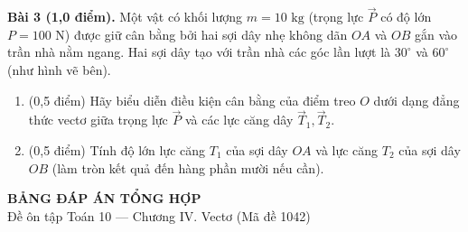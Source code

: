 \documentclass[10pt,a4paper]{article}
\begin{document}
\vspace{6pt}
\textbf{Bài 3 (1,0 điểm).} Một vật có khối lượng $m = 10\text{ kg}$ (trọng lực $\vec{P}$ có độ lớn $P = 100\text{ N}$) được giữ cân bằng bởi hai sợi dây nhẹ không dãn $OA$ và $OB$ gắn vào trần nhà nằm ngang. Hai sợi dây tạo với trần nhà các góc lần lượt là $30^\circ$ và $60^\circ$ (như hình vẽ bên).
\par\noindent\begin{minipage}[t]{0.70\linewidth}
\begin{enumerate}[label=\alph*), itemsep=2pt]
    \item (0,5 điểm) Hãy biểu diễn điều kiện cân bằng của điểm treo $O$ dưới dạng đẳng thức vectơ giữa trọng lực $\vec{P}$ và các lực căng dây $\vec{T}_1, \vec{T}_2$.
    \item (0,5 điểm) Tính độ lớn lực căng $T_1$ của sợi dây $OA$ và lực căng $T_2$ của sợi dây $OB$ (làm tròn kết quả đến hàng phần mười nếu cần).
\end{enumerate}
\end{minipage}\hfill
\begin{minipage}[t]{0.28\linewidth}\raggedleft\vspace{-15pt}
\end{minipage}


\newpage
\pagestyle{dapan}
\setcounter{page}{1}

\begin{center}
  {\Large\bfseries\color{ink} BẢNG ĐÁP ÁN TỔNG HỢP}\\[2pt]
  {\small\color{gray!75!black} Đề ôn tập Toán 10 — Chương IV. Vectơ (Mã đề 1042)}
\end{center}
\vspace{1pt}
\end{document}
